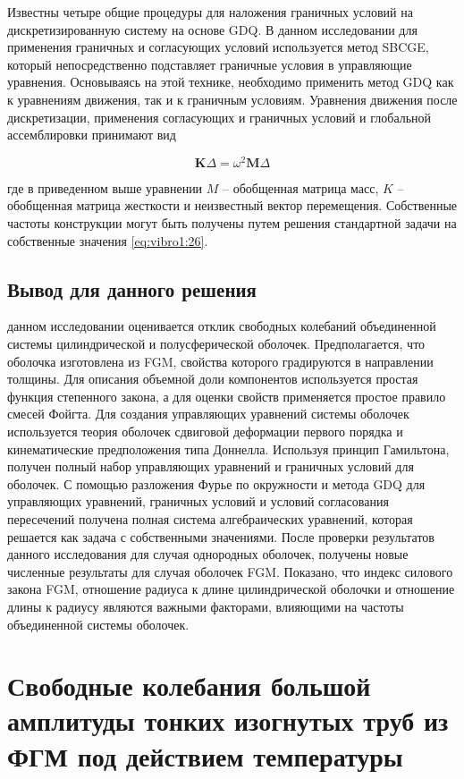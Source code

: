 Известны четыре общие процедуры для наложения граничных условий на дискретизированную систему на основе GDQ. В данном исследовании для применения граничных и согласующих условий используется метод SBCGE, который непосредственно подставляет граничные условия в управляющие уравнения. Основываясь на этой технике, необходимо применить метод GDQ как к уравнениям движения, так и к граничным условиям. Уравнения движения после дискретизации, применения согласующих и граничных условий и глобальной ассемблировки принимают вид

\begin{equation}
\label{eq:vibro1:26}
\boldsymbol{K } \Delta = \omega^2 \boldsymbol{M} \Delta
\end{equation}

где в приведенном выше уравнении \(M\) -- обобщенная матрица масс, \(K\) -- обобщенная матрица жесткости и неизвестный вектор перемещения. Собственные частоты конструкции могут быть получены путем решения стандартной задачи на собственные значения \cref{eq:vibro1:26}.

\subsection{Вывод для данного решения}\label{ch:ch3/sec2/sub5}

 данном исследовании оценивается отклик свободных колебаний объединенной системы цилиндрической и полусферической оболочек. Предполагается, что оболочка изготовлена из FGM, свойства которого градируются в направлении толщины. Для описания объемной доли компонентов используется простая функция степенного закона, а для оценки свойств применяется простое правило смесей Фойгта. Для создания управляющих уравнений системы оболочек используется теория оболочек сдвиговой деформации первого порядка и кинематические предположения типа Доннелла. Используя принцип Гамильтона, получен полный набор управляющих уравнений и граничных условий для оболочек. С помощью разложения Фурье по окружности и метода GDQ для управляющих уравнений, граничных условий и условий согласования пересечений получена полная система алгебраических уравнений, которая решается как задача с собственными значениями. После проверки результатов данного исследования для случая однородных оболочек, получены новые численные результаты для случая оболочек FGM. Показано, что индекс силового закона FGM, отношение радиуса к длине цилиндрической оболочки и отношение длины к радиусу являются важными факторами, влияющими на частоты объединенной системы оболочек.
 
\section{Свободные колебания большой амплитуды тонких изогнутых труб из ФГМ под действием температуры} \label{ch:ch3/sec3}